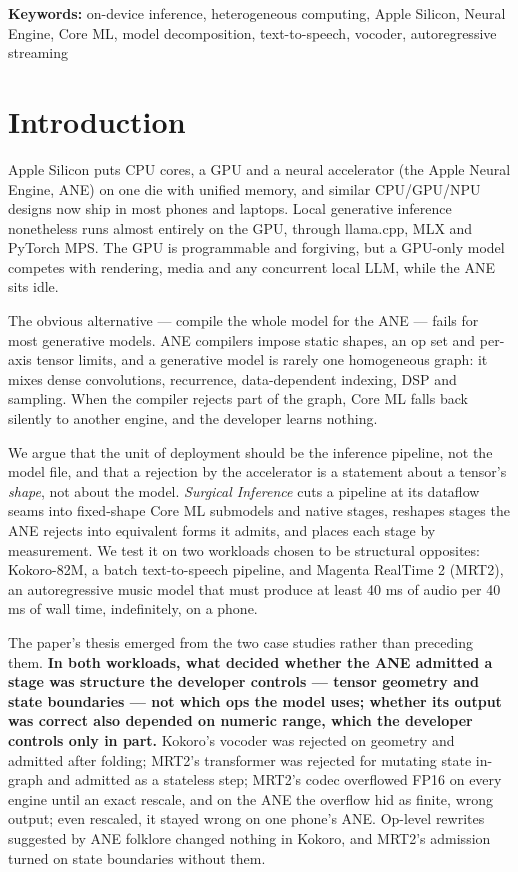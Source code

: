 \documentclass[11pt]{article}
\begin{document}
\noindent\textbf{Keywords:} on-device inference, heterogeneous computing, Apple Silicon, Neural Engine, Core ML, model decomposition, text-to-speech, vocoder, autoregressive streaming

\section{Introduction}\label{sec:intro}

Apple Silicon puts CPU cores, a GPU and a neural accelerator (the Apple Neural Engine, ANE) on one die with unified memory, and similar CPU/GPU/NPU designs now ship in most phones and laptops. Local generative inference nonetheless runs almost entirely on the GPU, through llama.cpp, MLX and PyTorch MPS. The GPU is programmable and forgiving, but a GPU-only model competes with rendering, media and any concurrent local LLM, while the ANE sits idle.

The obvious alternative --- compile the whole model for the ANE --- fails for most generative models. ANE compilers impose static shapes, an op set and per-axis tensor limits, and a generative model is rarely one homogeneous graph: it mixes dense convolutions, recurrence, data-dependent indexing, DSP and sampling. When the compiler rejects part of the graph, Core ML falls back silently to another engine, and the developer learns nothing.

We argue that the unit of deployment should be the inference pipeline, not the model file, and that a rejection by the accelerator is a statement about a tensor's \emph{shape}, not about the model. \emph{Surgical Inference} cuts a pipeline at its dataflow seams into fixed-shape Core ML submodels and native stages, reshapes stages the ANE rejects into equivalent forms it admits, and places each stage by measurement. We test it on two workloads chosen to be structural opposites: Kokoro-82M, a batch text-to-speech pipeline, and Magenta RealTime 2 (MRT2), an autoregressive music model that must produce at least 40 ms of audio per 40 ms of wall time, indefinitely, on a phone.

The paper's thesis emerged from the two case studies rather than preceding them. \textbf{In both workloads, what decided whether the ANE admitted a stage was structure the developer controls --- tensor geometry and state boundaries --- not which ops the model uses; whether its output was correct also depended on numeric range, which the developer controls only in part.} Kokoro's vocoder was rejected on geometry and admitted after folding; MRT2's transformer was rejected for mutating state in-graph and admitted as a stateless step; MRT2's codec overflowed FP16 on every engine until an exact rescale, and on the ANE the overflow hid as finite, wrong output; even rescaled, it stayed wrong on one phone's ANE. Op-level rewrites suggested by ANE folklore changed nothing in Kokoro, and MRT2's admission turned on state boundaries without them.
\end{document}
